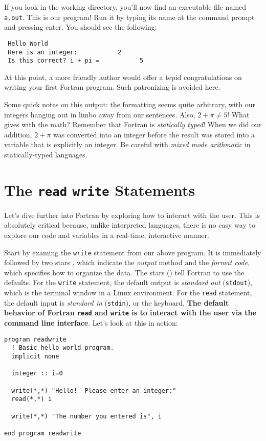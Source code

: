 \documentclass[11pt, letterpaper]{article}
\begin{document}
If you look in the working directory, you'll now find an executable file
named \texttt{a.out}.  This is our program!  Run it by typing its name at the
command prompt and pressing enter.  You should see the following:

\begin{verbatim}
 Hello World
 Here is an integer:           2
 Is this correct? i + pi =           5
\end{verbatim}


At this point, a more friendly author would offer a tepid congratulations on
writing your first Fortran program.  Such patronizing is avoided here.

Some quick notes on this output: the formatting seems quite arbitrary, with our
integers hanging out in limbo away from our sentences.  Also, $2+\pi \neq 5$!
What gives with the math?  Remember that Fortran is \emph{statically typed}!  When
we did our addition, $2+\pi$ was converted into an integer before the result was
stored into a variable that is explicitly an integer.  Be careful with
\emph{mixed mode arithmatic} in statically-typed languages.

\section{The \texttt{read} \texttt{write} Statements}

Let's dive further into Fortran by exploring how to interact with the user.
This is absolutely critical because, unlike interpreted languages, there is
no easy way to explore our code and variables in a real-time, interactive
manner.

Start by examing the \texttt{write} statement from our above program.
It is immediately followed by two stars {\tt *}, which indicate the \emph{output}
method and the \emph{format code}, which specifies how to organize the
data.  The stars ({\tt *}) tell Fortran to use the defaults.  For the {\tt write}
statement, the default output is \emph{standard out} ({\tt stdout}), which is
the terminal window in a Linux environment.  For the {\tt read} statement, the
default input is \emph{standard in} ({\tt stdin}), or the keyboard.
\textbf{The default behavior of Fortran {\tt read} and {\tt write} is to interact
  with the user via the command line interface}.  Let's look at this in action:

\begin{verbatim}
program readwrite
  ! Basic hello world program.
  implicit none
  
  integer :: i=0
  
  write(*,*) "Hello!  Please enter an integer:"
  read(*,*) i

  write(*,*) "The number you entered is", i

end program readwrite
\end{verbatim}
\end{document}
